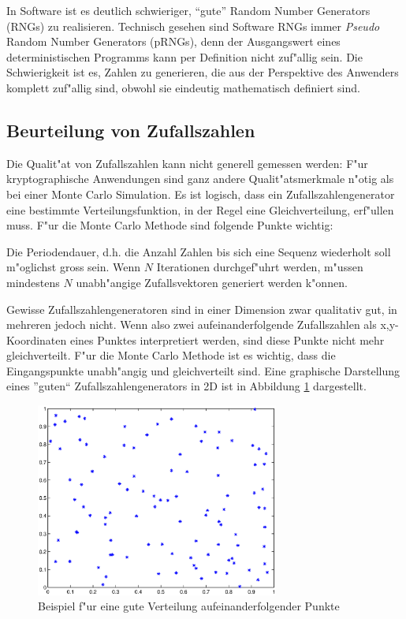 \begin{refsection}
In Software ist es deutlich schwieriger, ``gute'' Random Number
Generators (RNGs) zu realisieren. Technisch gesehen sind Software
RNGs immer \textit{Pseudo} Random Number Generators (pRNGs),  denn
der Ausgangswert eines deterministischen Programms kann per Definition
nicht zuf"allig sein. Die Schwierigkeit ist es, Zahlen zu generieren,
die aus der Perspektive des Anwenders komplett zuf"allig sind, obwohl
sie eindeutig mathematisch definiert sind.

\subsection{Beurteilung von Zufallszahlen}
Die Qualit"at von Zufallszahlen kann nicht generell gemessen werden:
F"ur kryptographische Anwendungen sind ganz andere Qualit"atsmerkmale
n"otig als bei einer Monte Carlo Simulation. Es ist logisch, dass ein
Zufallszahlengenerator eine bestimmte Verteilungsfunktion, in der Regel
eine Gleichverteilung, erf"ullen muss. F"ur die Monte Carlo Methode sind
folgende Punkte wichtig:

Die Periodendauer, d.h. die Anzahl Zahlen bis sich eine Sequenz wiederholt
soll m"oglichst gross sein. Wenn $N$ Iterationen durchgef"uhrt werden,
m"ussen mindestens $N$ unabh"angige Zufallsvektoren generiert werden
k"onnen.

Gewisse Zufallszahlengeneratoren sind in einer Dimension zwar qualitativ
gut, in mehreren jedoch nicht. Wenn also zwei aufeinanderfolgende
Zufallszahlen als x,y-Koordinaten eines Punktes interpretiert werden,
sind diese Punkte nicht mehr gleichverteilt. F"ur die Monte Carlo Methode
ist es wichtig, dass die Eingangspunkte unabh"angig und gleichverteilt
sind. Eine graphische Darstellung eines ''guten`` Zufallszahlengenerators
in 2D ist in Abbildung \ref{fig:Zufallszahlen_gut} dargestellt.

\begin{figure}[htbp]
	\centering
	\includegraphics[width=8cm]{montecarlo/images/Zufallszahlen_gut.eps}
	\caption{Beispiel f"ur eine gute Verteilung aufeinanderfolgender Punkte}
	\label{fig:Zufallszahlen_gut}
\end{figure}


\end{refsection}

